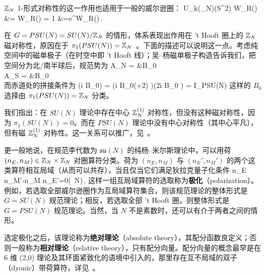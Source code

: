$\mathbb{Z}_N$ 1-形式对称性的这一作用也适用于一般的威尔逊圈：
\be
\ba
U_{k(\in \bbZ_N)}(S^2) W_R(\gamma) &= W_R(\gamma)  \quad {} = 1\cr
&=e^{}W_R(\gamma)\,.
\ea
\ee

在 $G = PSU(N) = SU(N)/{\mathbb{Z}}_N$ 的情形，体系表现出作用在 't Hooft 圈上的 ${\mathbb{Z}}_N$ 磁对称性，原因在于 $\pi_1(PSU(N))=\mathbb{Z}_N$~\cite{TongGauge}。下面的描述可以说明这一点。考虑纯空间中的磁单极子（在时空中即 't Hooft 线）；吴–杨磁单极子构造告诉我们，把空间分为北/南半球后，规范势为
\be\ba
A_N = &B_0  \dd \phi \\
A_S = &B_0  \dd \phi \\
\ea\ee
而赤道处的拼接条件为
\be \exp(i B_0\phi) =  \exp(i B_0(\phi+2\pi) )\Rightarrow \exp(2\pi i B_0 ) = I_{PSU(N)} \ee
这样的 $B_0$ 选择由 $\pi_1(PSU(N)) = {\mathbb{Z}}_N$ 分类。

我们指出：在 $SU(N)$ 理论中存在中心 ${\mathbb{Z}}_N^{(1)}$ 对称性，但没有这种磁对称性，因为 $\pi_1(SU(N)) = 0$。而在 $PSU(N)$ 理论中没有中心对称性（其中心平凡），但有磁 ${\mathbb{Z}}_N^{(1)}$ 对称性。这一关系可以推广，见~\cite{Brennan:2023mmt}。

更一般地说，在规范李代数为 $\mathfrak{su}(N)$ 的纯杨–米尔斯理论中，可以用荷 $(n_E,n_M)\in {\mathbb{Z}}_N\times {\mathbb{Z}}_N$ 对圈算符分类。荷为 $(n_E,n_M)$ 与 $(n_E',n_M')$ 的两个这类算符相互局域（从而可以共存），当且仅当它们满足狄拉克量子化条件
\be
n_E n_M'-n_M n_E'=0\quad (\ N)\,.
\ee
这样一组互局域算符的选取称为\textbf{极化}（polarization）。例如，若选取全部威尔逊圈作为互局域算符集合，则该规范理论的整体形式是 $G=SU(N)$ 规范理论；相反，若选取全部 't Hooft 圈，则整体形式是 $G=PSU(N)$ 规范理论。当然，当 $N$ 不是素数时，还可以有介于两者之间的情形。

选定极化之后，该理论称为\textbf{绝对理论}（absolute theory），其配分函数良定义；否则一般称为\textbf{相对理论}（relative theory），只有配分向量。配分向量的概念最早是在 6 维 (2,0) 理论及其环面紧致化的语境中引入的，那里存在互不局域的双子（dyonic）带荷算符，详见~\cite{Witten:2009at,Freed:2012bs,Tachikawa:2013hya}。
